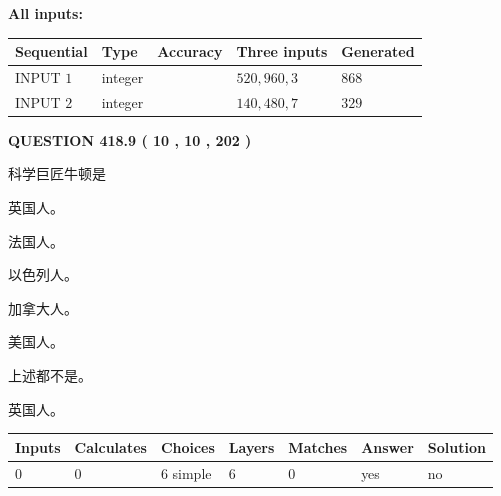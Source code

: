 \documentclass{ctexart}
\begin{document}
   
   
   
\noindent\vspace{0.1in}\hspace{-0.08in} {\textbf{\Large{All inputs: }}}
   
   
  
  
\noindent\begin{tabular}{|l|l|l|l|l|}
\hline
 Sequential & Type & Accuracy & Three inputs & Generated \\ 
\hline
 
 
  INPUT $  1 $ & integer &  & $
 520
 , 
 960
 , 
 3
 $ & $ 868 $ 
 \\  \hline  
 
 
  INPUT $  2 $ & integer &  & $
 140
 , 
 480
 , 
 7
 $ & $ 329 $ 
 \\  \hline  
 \end{tabular}
   
   
  
\vspace{0.2in}
  
{\textbf{\Large{QUESTION
418.9 
 ( 10 , 10 , 202 )
}}}
  
  
科学巨匠牛顿是
 
 
英国人。
 
 
法国人。
 
 
以色列人。
 
 
加拿大人。
 
 
美国人。
 
 
 上述都不是。
 
 
\noindent{}
 
 
英国人。
 
 
\noindent{}
 
 
   
   
   
   
\noindent\begin{tabular}{|l|l|l|l|l|l|l|}
 \hline
Inputs & Calculates & Choices & Layers & Matches & Answer & Solution \\ \hline
 0  & 
 0  & 
 6
  simple  
  & 
 6  & 
 0  & 
  yes & 
  no 
  \\ \hline
 \end{tabular}
   
\end{document}
